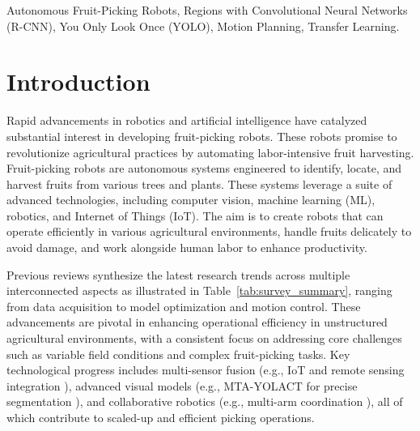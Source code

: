 \documentclass[a4paper,fleqn]{cas-dc}
\begin{document}


\begin{keywords}
 Autonomous Fruit-Picking Robots,
Regions with Convolutional Neural Networks (R-CNN),
You Only Look Once (YOLO),
Motion Planning,
Transfer Learning.
\end{keywords}

\maketitle

\section{Introduction}
Rapid advancements in robotics and artificial intelligence have catalyzed substantial interest in developing fruit-picking robots. These robots promise to revolutionize agricultural practices by automating labor-intensive fruit harvesting. 
Fruit-picking robots are autonomous systems engineered to identify, locate, and harvest fruits from various trees and plants. These systems leverage a suite of advanced technologies, including computer vision, machine learning (ML), robotics, and Internet of Things (IoT). The aim is to create robots that can operate efficiently in various agricultural environments, handle fruits delicately to avoid damage, and work alongside human labor to enhance productivity. 

Previous reviews synthesize the latest research trends across multiple interconnected aspects as illustrated in Table~\ref{tab:survey_summary}, ranging from data acquisition to model optimization and motion control. These advancements are pivotal in enhancing operational efficiency in unstructured agricultural environments, with a consistent focus on addressing core challenges such as variable field conditions and complex fruit-picking tasks. Key technological progress includes multi-sensor fusion (e.g., IoT and remote sensing integration \cite{mohamed2021smart,friha2021internet,martos2021ensuring}), advanced visual models (e.g., MTA-YOLACT for precise segmentation \cite{li2023mta}), and collaborative robotics (e.g., multi-arm coordination \cite{lytridis2021overview,li2023multi}), all of which contribute to scaled-up and efficient picking operations.
\end{document}
